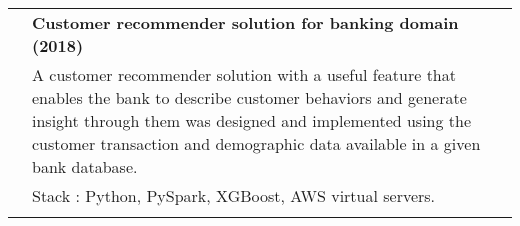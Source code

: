 \documentclass[a4paper,11pt]{article}
\begin{document}
\begin{supertabular}{r|p{17.5cm}}
 \textsc{} & \normalsize \bf Customer recommender solution for banking domain (2018) \\&\small {A customer recommender solution with a useful feature that enables the bank to describe customer behaviors and generate insight through them was designed and implemented using the customer transaction and demographic data available in a given bank database. }\\&\footnotesize{Stack : Python, PySpark, XGBoost, AWS virtual servers.}\\ \\
 
  
\end{supertabular}
\end{document}
